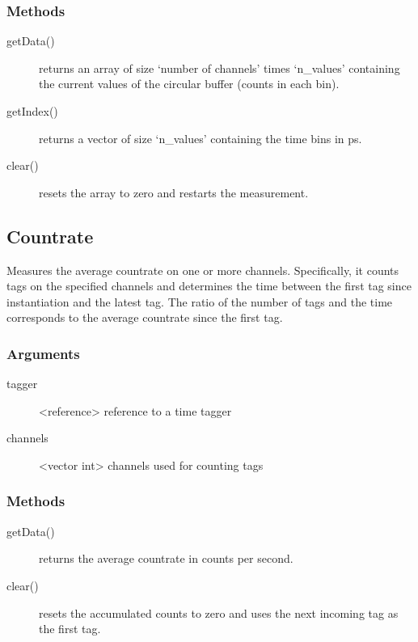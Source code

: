 \documentclass[letterpaper,10pt,english]{sphinxmanual}
\begin{document}
\subsubsection{Methods}
\label{sections/api:id5}\begin{description}
\item[{getData()}] \leavevmode
returns an array of size `number of channels' times `n\_values' containing the current values of the circular buffer
(counts in each bin).

\item[{getIndex()}] \leavevmode
returns a vector of size `n\_values' containing the time bins in ps.

\item[{clear()}] \leavevmode
resets the array to zero and restarts the measurement.

\end{description}


\subsection{Countrate}
\label{sections/api:countrate}
Measures the average countrate on one or more channels. Specifically, it
counts tags on the specified channels and determines the time between the first tag since
instantiation and the latest tag. The ratio of the number of tags and the
time corresponds to the average countrate since the first tag.


\subsubsection{Arguments}
\label{sections/api:id6}\begin{description}
\item[{tagger}] \leavevmode
\textless{}reference\textgreater{} reference to a time tagger

\item[{channels}] \leavevmode
\textless{}vector int\textgreater{} channels used for counting tags

\end{description}


\subsubsection{Methods}
\label{sections/api:id7}\begin{description}
\item[{getData()}] \leavevmode
returns the average countrate in counts per second.

\item[{clear()}] \leavevmode
resets the accumulated counts to zero and uses the next incoming tag as the first tag.

\end{description}
\end{document}
